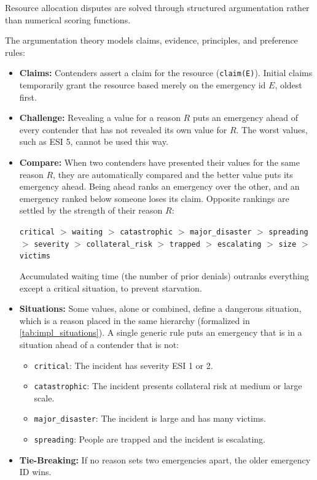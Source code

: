 Resource allocation disputes are solved through structured argumentation rather than numerical scoring functions.

The argumentation theory models claims, evidence, principles, and preference rules:
\begin{itemize}
    \item \textbf{Claims:} Contenders assert a claim for the resource (\texttt{claim(E)}). Initial claims temporarily grant the resource based merely on the emergency id $E$, oldest first.
    \item \textbf{Challenge:} Revealing a value for a reason $R$ puts an emergency ahead of every contender that has not revealed its own value for $R$. The worst values, such as ESI 5, cannot be used this way.
    \item \textbf{Compare:} When two contenders have presented their values for the same reason $R$, they are automatically compared and the better value puts its emergency ahead. Being ahead ranks an emergency over the other, and an emergency ranked below someone loses its claim. Opposite rankings are settled by the strength of their reason $R$:
    \begin{center}
    \texttt{critical} $>$ \texttt{waiting} $>$ \texttt{catastrophic} $>$ \texttt{major\_disaster} $>$ \texttt{spreading} $>$ \texttt{severity} $>$ \texttt{collateral\_risk} $>$ \texttt{trapped} $>$ \texttt{escalating} $>$ \texttt{size} $>$ \texttt{victims}
    \end{center}
    Accumulated waiting time (the number of prior denials) outranks everything except a critical situation, to prevent starvation.
    
    \item \textbf{Situations:} Some values, alone or combined, define a dangerous situation, which is a reason placed in the same hierarchy (formalized in \cref{tab:impl_situations}). A single generic rule puts an emergency that is in a situation ahead of a contender that is not:
    \begin{itemize}
        \item \texttt{critical}: The incident has severity ESI 1 or 2.
        \item \texttt{catastrophic}: The incident presents collateral risk at medium or large scale.
        \item \texttt{major\_disaster}: The incident is large and has many victims.
        \item \texttt{spreading}: People are trapped and the incident is escalating.
    \end{itemize}
    
    \item \textbf{Tie-Breaking:} If no reason sets two emergencies apart, the older emergency ID wins.
\end{itemize}

